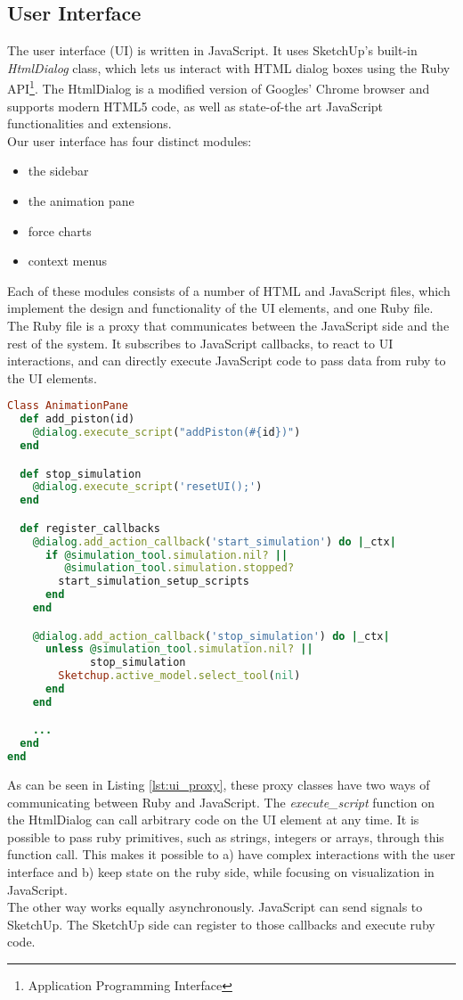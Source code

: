 \subsection{User Interface}
The user interface (UI) is written in JavaScript. It uses SketchUp's built-in \textit{HtmlDialog} class, which lets us interact with HTML dialog boxes using the Ruby API\footnote{Application Programming Interface}. The HtmlDialog is a modified version of Googles' Chrome browser and supports modern HTML5 code, as well as state-of-the art JavaScript functionalities and extensions.\\
Our user interface has four distinct modules:
\begin{itemize}
    \item the sidebar
    \item the animation pane
    \item force charts
    \item context menus
\end{itemize}

Each of these modules consists of a number of HTML and JavaScript files, which implement the design and functionality of the UI elements, and one Ruby file. The Ruby file is a proxy that communicates between the JavaScript side and the rest of the system. It subscribes to JavaScript callbacks, to react to UI interactions, and can directly execute JavaScript code to pass data from ruby to the UI elements.
\begin{lstlisting}[language=Ruby, label={lst:ui_proxy}, caption=excerpt from UI callbacks]
Class AnimationPane
  def add_piston(id)
    @dialog.execute_script("addPiston(#{id})")
  end

  def stop_simulation
    @dialog.execute_script('resetUI();')
  end

  def register_callbacks
    @dialog.add_action_callback('start_simulation') do |_ctx|
      if @simulation_tool.simulation.nil? ||
         @simulation_tool.simulation.stopped?
        start_simulation_setup_scripts
      end
    end

    @dialog.add_action_callback('stop_simulation') do |_ctx|
      unless @simulation_tool.simulation.nil? ||
             stop_simulation
        Sketchup.active_model.select_tool(nil)
      end
    end

    ...
  end
end
\end{lstlisting}
As can be seen in Listing \ref{lst:ui_proxy}, these proxy classes have two ways of communicating between Ruby and JavaScript. The \textit{execute\_script} function on the HtmlDialog can call arbitrary code on the UI element at any time. It is possible to pass ruby primitives, such as strings, integers or arrays, through this function call. This makes it possible to a) have complex interactions with the user interface and b) keep state on the ruby side, while focusing on visualization in JavaScript.\\
The other way works equally asynchronously. JavaScript can send signals to SketchUp. The SketchUp side can register to those callbacks and execute ruby code.

